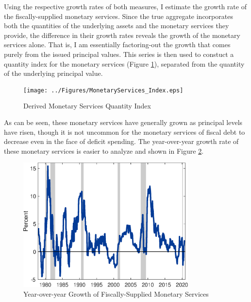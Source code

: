 \documentclass[11pt,a4paper,margin=1.5in]{article}
\begin{document}
Using the respective growth rates of both measures, I estimate the growth rate of the fiscally-supplied monetary services.
Since the true aggregate incorporates both the quantities of the underlying assets and the monetary services they provide, the difference in their growth rates reveals the growth of the monetary services alone.
That is, I am essentially factoring-out the growth that comes purely from the issued principal values.
This series is then used to constuct a quantity index for the monetary services (Figure \ref{fig:MS_Index}), separated from the quantity of the underlying principal value.
\begin{figure}[p]
	\centering
	\texttt{[image: ../Figures/MonetaryServices\_Index.eps]}
	\caption{Derived Monetary Services Quantity Index}
	\label{fig:MS_Index}
\end{figure}
As can be seen, these monetary services have generally grown as principal levels have risen, though it is not uncommon for the monetary services of fiscal debt to decrease even in the face of deficit spending.
The year-over-year growth rate of these monetary services is easier to analyze and shown in Figure \ref{fig:YoY_Growth}.
\begin{figure}[p]
	\centering
	\includegraphics[width=0.8\textwidth]{../Figures/YoYGrowth_MonServices.eps}
	\caption{Year-over-year Growth of Fiscally-Supplied Monetary Services}
	\label{fig:YoY_Growth}
\end{figure}


\end{document}
